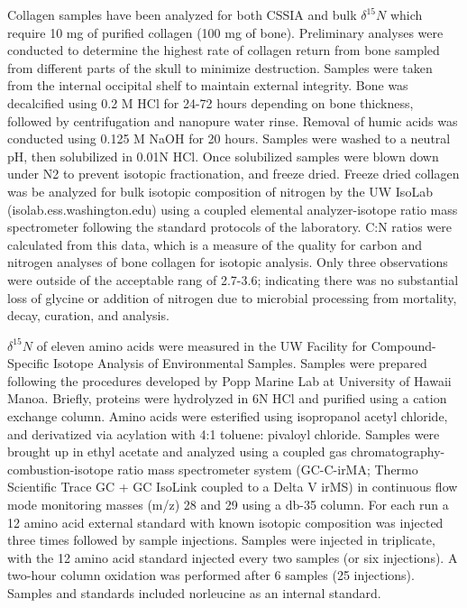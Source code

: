 \documentclass [11pt, proquest] {uwthesis}[2015/03/03]
\begin{document}
Collagen samples have been analyzed for both CSSIA and bulk
\(\delta^{15}N\) which require 10 mg of purified collagen (100 mg of
bone). Preliminary analyses were conducted to determine the highest rate
of collagen return from bone sampled from different parts of the skull
to minimize destruction. Samples were taken from the internal occipital
shelf to maintain external integrity. Bone was decalcified using 0.2 M
HCl for 24-72 hours depending on bone thickness, followed by
centrifugation and nanopure water rinse. Removal of humic acids was
conducted using 0.125 M NaOH for 20 hours. Samples were washed to a
neutral pH, then solubilized in 0.01N HCl. Once solubilized samples were
blown down under N2 to prevent isotopic fractionation, and freeze dried.
Freeze dried collagen was be analyzed for bulk isotopic composition of
nitrogen by the UW IsoLab (isolab.ess.washington.edu) using a coupled
elemental analyzer-isotope ratio mass spectrometer following the
standard protocols of the laboratory. C:N ratios were calculated from
this data, which is a measure of the quality for carbon and nitrogen
analyses of bone collagen for isotopic analysis. Only three observations
were outside of the acceptable rang of 2.7-3.6; indicating there was no
substantial loss of glycine or addition of nitrogen due to microbial
processing from mortality, decay, curation, and analysis.

\(\delta^{15}N\) of eleven amino acids were measured in the UW Facility
for Compound-Specific Isotope Analysis of Environmental Samples. Samples
were prepared following the procedures developed by Popp Marine Lab at
University of Hawaii Manoa. Briefly, proteins were hydrolyzed in 6N HCl
and purified using a cation exchange column. Amino acids were esterified
using isopropanol acetyl chloride, and derivatized via acylation with
4:1 toluene: pivaloyl chloride. Samples were brought up in ethyl acetate
and analyzed using a coupled gas chromatography-combustion-isotope ratio
mass spectrometer system (GC-C-irMA; Thermo Scientific Trace GC + GC
IsoLink coupled to a Delta V irMS) in continuous flow mode monitoring
masses (m/z) 28 and 29 using a db-35 column. For each run a 12 amino
acid external standard with known isotopic composition was injected
three times followed by sample injections. Samples were injected in
triplicate, with the 12 amino acid standard injected every two samples
(or six injections). A two-hour column oxidation was performed after 6
samples (25 injections). Samples and standards included norleucine as an
internal standard.
\end{document}
